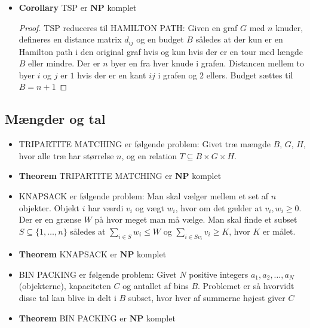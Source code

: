 \begin{itemize}
\begin{proof}
  \end{proof}
  \item \textbf{Corollary} TSP er $\mathbf{NP}$ komplet
  \begin{proof} 
    TSP reduceres til HAMILTON PATH: Given en graf $G$ med $n$ knuder, defineres en distance matrix $d_{ij}$ og en budget $B$ således at der kun er en Hamilton path i den original graf hvis og kun hvis der er en tour med længde $B$ eller mindre. Der er $n$ byer en fra hver knude i grafen. Distancen mellem to byer $i$ og $j$ er $1$ hvis der er en kant $ij$ i grafen og $2$ ellers. Budget sættes til $B=n+1$ 

  \end{proof}
\end{itemize}

\subsection{Mængder og tal}
\begin{itemize}
  \item TRIPARTITE MATCHING er følgende problem: Givet træ mængde $B$, $G$, $H$, hvor alle træ har størrelse $n$, og en relation $T \subseteq B \times G \times H$. 
  \item \textbf{Theorem} TRIPARTITE MATCHING er $\mathbf{NP}$ komplet
  \item KNAPSACK er følgende problem: Man skal vælger mellem et set af $n$ objekter. Objekt $i$ har værdi $v_i$ og vægt $w_i$, hvor om det gælder at $v_i, w_i \geq 0$. Der er en grænse $W$ på hvor meget man må vælge. Man skal finde et subset $S \subseteq \{1,\dots,n\}$ således at $\sum_{i \in S} w_i \leq W$ og $\sum_{i \in S v_i} v_i \geq K$, hvor $K$ er målet. 
  \item \textbf{Theorem} KNAPSACK er $\mathbf{NP}$ komplet
  \item BIN PACKING er følgende problem: Givet $N$ positive integers $a_1, a_2, \dots, a_N$ (objekterne), kapaciteten $C$ og antallet af bins $B$. Problemet er så hvorvidt disse tal kan blive in delt i $B$ subset, hvor hver af summerne højest giver $C$ 
  \item \textbf{Theorem} BIN PACKING er $\mathbf{NP}$ komplet
\end{itemize}

